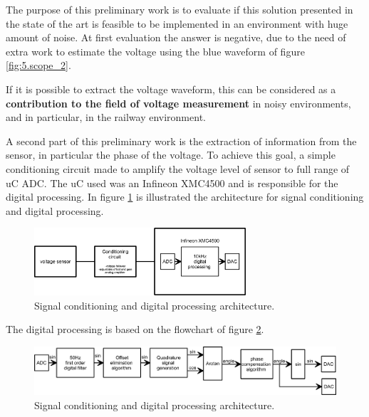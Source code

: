 	The purpose of this preliminary work is to evaluate if this solution presented in the state of the art is feasible to be implemented in an environment with huge amount of noise. At first evaluation the answer is negative, due to the need of extra work to estimate the voltage using the blue waveform of figure \ref{fig:5.scope_2}.
	
	
	If it is possible to extract the voltage waveform, this can be considered as a \textbf{contribution to the field of voltage measurement} in noisy environments, and in particular, in the railway environment.

\newpage

	A second part of this preliminary work is the extraction of information from the sensor, in particular the phase of the voltage. To achieve this goal, a simple conditioning circuit made to amplify the voltage level of sensor to full range of uC ADC. The uC used was an Infineon XMC4500 and is responsible for the digital processing. In figure \ref{fig:5.generalArchitecture} is illustrated the architecture for signal conditioning and digital processing.
	
	\begin{figure}[h!]
		\centering
		\includegraphics[width=0.7\textwidth,keepaspectratio]{figures/5.PreliminaryW/generalArchitecture}
		\caption{Signal conditioning and digital processing architecture.}
		\label{fig:5.generalArchitecture}
	\end{figure}

	The digital processing is based on the flowchart of figure \ref{fig:5.processingArchitecture}.
	
	\begin{figure}[h!]
		\centering
		\includegraphics[width=\textwidth,keepaspectratio]{figures/5.PreliminaryW/processingArchitecture}
		\caption{Signal conditioning and digital processing architecture.}
		\label{fig:5.processingArchitecture}
	\end{figure}

